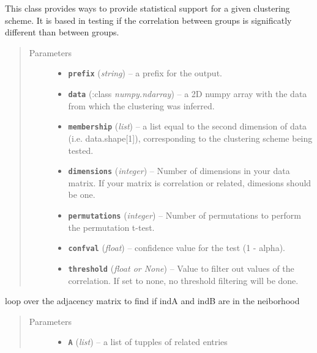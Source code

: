 \documentclass[letterpaper,10pt,english]{sphinxmanual}
\begin{document}
\begin{fulllineitems}
\label{Doc:Moduler.SupportClustering}
This class provides ways to provide statistical support for a given clustering scheme. It is based in
testing if the correlation between groups is significatly different than  between groups.
\begin{quote}\begin{description}
\item[{Parameters}] \leavevmode\begin{itemize}
\item {} 
\textbf{\texttt{prefix}} (\emph{string}) -- a prefix for the output.

\item {} 
\textbf{\texttt{data}} (:class \emph{numpy.ndarray}) -- a 2D numpy array with the data from which the clustering was inferred.

\item {} 
\textbf{\texttt{membership}} (\emph{list}) -- a list equal to the second dimension of data (i.e. data.shape{[}1{]}), corresponding to the clustering scheme being tested.

\item {} 
\textbf{\texttt{dimensions}} (\emph{integer}) -- Number of dimensions in your data matrix. If your matrix is correlation or related, dimesions should be one.

\item {} 
\textbf{\texttt{permutations}} (\emph{integer}) -- Number of permutations to perform the permutation t-test.

\item {} 
\textbf{\texttt{confval}} (\emph{float}) -- confidence value for the test (1 - alpha).

\item {} 
\textbf{\texttt{threshold}} (\emph{float or None}) -- Value to filter out values of the correlation. If set to none, no threshold filtering will be done.

\end{itemize}

\end{description}\end{quote}

\begin{fulllineitems}
\label{Doc:Moduler.SupportClustering.AreModneighbours}
loop over the adjacency matrix to find if indA and indB are in the neiborhood
\begin{quote}\begin{description}
\item[{Parameters}] \leavevmode\begin{itemize}
\item {} 
\textbf{\texttt{A}} (\emph{list}) -- a list of tupples of related entries


\end{itemize}
\end{description}
\end{quote}
\end{fulllineitems}
\end{fulllineitems}
\end{document}
